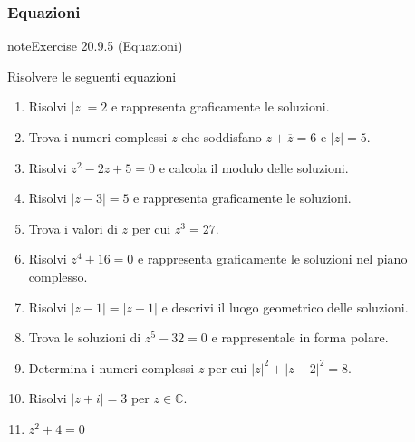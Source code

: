 \documentclass[letterpaper,10pt,italian]{jupyterBook}
\begin{document}
\subsubsection{Equazioni}
\label{\detokenize{ch/algebra/complex-algebra-problems:equazioni}}\label{\detokenize{ch/algebra/complex-algebra-problems:math-hs-algebra-complex-problems-equations-eq}} \label{exercise:ch/algebra/complex-algebra-problems-exercise-4}

\begin{sphinxadmonition}{note}{Exercise 20.9.5 (Equazioni)}



\sphinxAtStartPar
Risolvere le seguenti equazioni
\begin{enumerate}
%
\item {} 
\sphinxAtStartPar
Risolvi \(|z| = 2\) e rappresenta graficamente le soluzioni.

\item {} 
\sphinxAtStartPar
Trova i numeri complessi \(z\) che soddisfano \(z + \overline{z} = 6\) e \(|z| = 5\).

\item {} 
\sphinxAtStartPar
Risolvi \(z^2 - 2z + 5 = 0\) e calcola il modulo delle soluzioni.

\item {} 
\sphinxAtStartPar
Risolvi \(|z - 3| = 5\) e rappresenta graficamente le soluzioni.

\item {} 
\sphinxAtStartPar
Trova i valori di \(z\) per cui \(z^3 = 27\).

\item {} 
\sphinxAtStartPar
Risolvi \(z^4 + 16 = 0\) e rappresenta graficamente le soluzioni nel piano complesso.

\item {} 
\sphinxAtStartPar
Risolvi \(|z - 1| = |z + 1|\) e descrivi il luogo geometrico delle soluzioni.

\item {} 
\sphinxAtStartPar
Trova le soluzioni di \(z^5 - 32 = 0\) e rappresentale in forma polare.

\item {} 
\sphinxAtStartPar
Determina i numeri complessi \(z\) per cui \(|z|^2 + |z - 2|^2 = 8\).

\item {} 
\sphinxAtStartPar
Risolvi \(|z + i| = 3\) per \(z \in \mathbb{C}\).

\item {} 
\sphinxAtStartPar
\(z^2 + 4 = 0\)


\end{enumerate}
\end{sphinxadmonition}
\end{document}
